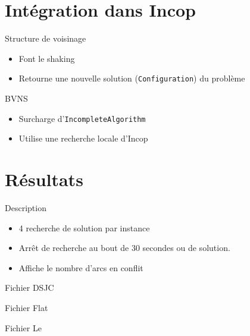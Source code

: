 \documentclass{beamer}
\begin{document}
	\section{Intégration dans Incop}
		\begin{frame}{Structure de voisinage}
			\begin{itemize}
				\item Font le shaking
				\item Retourne une nouvelle solution (\texttt{Configuration}) du problème
			\end{itemize}
		\end{frame}
		
		\begin{frame}{BVNS}
			\begin{itemize}
				\item Surcharge d'\texttt{IncompleteAlgorithm}
				\item Utilise une recherche locale d'Incop
			\end{itemize}
		\end{frame}
	
	\section{Résultats}
	
		\begin{frame}{Description}
			\begin{itemize}
				\item 4 recherche de solution par instance
				\item Arrêt de recherche au bout de 30 secondes ou de solution.
				\item Affiche le nombre d'arcs en conflit
			\end{itemize}
		\end{frame}
		
		\begin{frame}{Fichier DSJC}
			
		\end{frame}
		
		\begin{frame}{Fichier Flat}
			
		\end{frame}
		
		\begin{frame}{Fichier Le}
			
		\end{frame}
	
\end{document}

